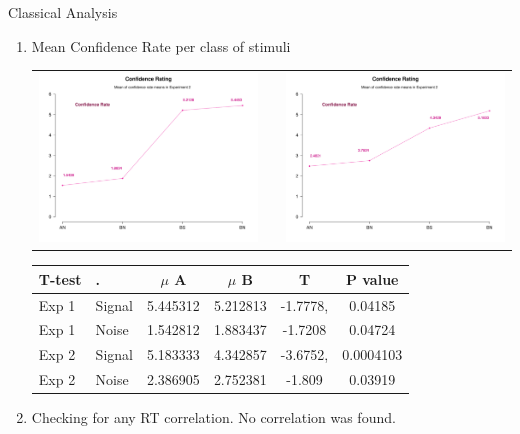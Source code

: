 \documentclass[final]{beamer}
\newlength{\onecolwid}
\newlength{\twocolwid}
\begin{document}
\begin{frame}[t]
\begin{columns}[t]
\begin{column}{\twocolwid}
\begin{columns}[t,totalwidth=\twocolwid]
\begin{column}{\onecolwid}
\begin{alertblock}{Classical Analysis}
\begin{enumerate}
\item Mean Confidence Rate per class of stimuli
\begin{center}
\begin{tabular}{ccc}
\includegraphics[width=0.4\linewidth]{Figures/MirrorConfidence_1.pdf} & \hfill & \includegraphics[width=0.4\linewidth]{Figures/MirrorConfidence_2.pdf}
\end{tabular}
\end{center}
\begin{table}
\vspace{3ex}
\begin{tabular}{l l |  c c c c}
\toprule
\textbf{T-test} & \textbf{.} & \textbf{$\mu$ A} & \textbf{$\mu$ B} & \textbf{T} & \textbf{P value}\\
\midrule
Exp 1 & Signal & 5.445312 & 5.212813 & -1.7778, & 0.04185 \\
Exp 1 & Noise & 1.542812 & 1.883437 & -1.7208 & 0.04724 \\
Exp 2 & Signal & 5.183333 & 4.342857  & -3.6752, & 0.0004103 \\
Exp 2 & Noise & 2.386905 & 2.752381 & -1.809 & 0.03919 \\
\bottomrule
\end{tabular}
\end{table}
\item Checking for any RT correlation.
No correlation was found.
\end{enumerate}
\end{alertblock}
\end{column} %


\end{columns}
\end{column}
\end{columns}
\end{frame}
\end{document}
